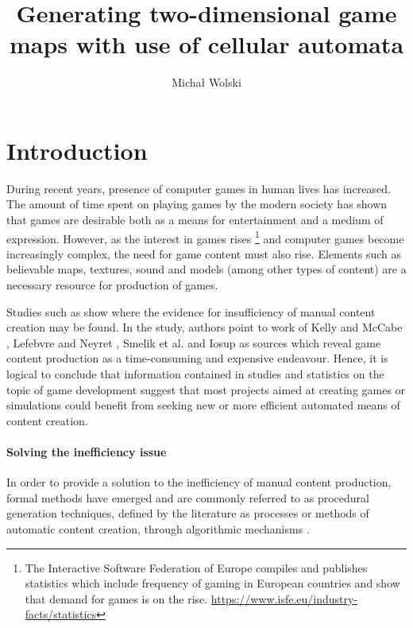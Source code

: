 \documentclass[12pt]{report}
\title{Generating two-dimensional game maps with use of cellular automata}
\author{Michał Wolski}
\begin{document}
\maketitle
\renewcommand{\contentsname}{Table of contents}
\tableofcontents 

\listoftodos

\chapter{Introduction} \label{rozdzial.wstep} 
During recent years, presence of computer games in human lives has increased. The amount of time spent on playing games by the modern society has shown that games are desirable both as a means for entertainment and a medium of expression. However, as the interest in games rises \footnote{The Interactive Software Federation of Europe compiles and publishes statistics which include frequency of gaming in European countries and show that demand for games is on the rise. \url{https://www.isfe.eu/industry-facts/statistics}} and computer games become increasingly complex, the need for game content must also rise. Elements such as believable maps, textures, sound and models (among other types of content) are a necessary resource for production of games. 

Studies such as \autocite{hendrikx2013procedural} show where the evidence for insufficiency of manual content creation may be found. In the study, authors point to work of Kelly and McCabe \autocite{kelly2007citygen}, Lefebvre and Neyret \autocite{lefebvre2003pattern}, Smelik et al. \autocite{smelik2009survey} and Iosup \autocite{iosup2009poggi} as sources which reveal game content production as a time-consuming and expensive endeavour. Hence, it is logical to conclude that information contained in studies and statistics on the topic of game development suggest that most projects aimed at creating games or simulations could benefit from seeking new or more efficient automated means of content creation.

\subsubsection{Solving the inefficiency issue}
In order to provide a solution to the inefficiency of manual content production, formal methods have emerged and are commonly referred to as procedural generation techniques, defined by the literature as processes or methods of automatic content creation, through algorithmic mechanisms \autocite{togelius2011search} \autocite{yannakakis2015experience}.
\end{document}
